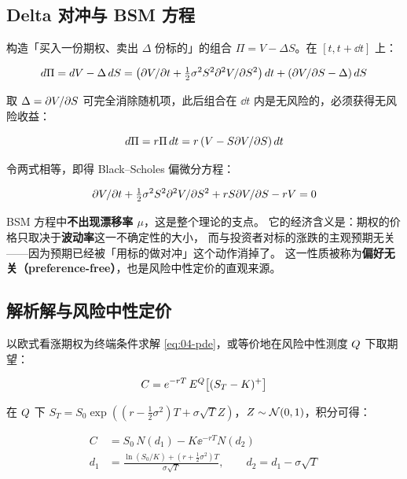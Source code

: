 \subsection{Delta 对冲与 BSM 方程}

构造「买入一份期权、卖出 $\Delta$ 份标的」的组合 $\Pi = V - \Delta S$。在 $[t, t+\dd t]$ 上：

\begin{equation}
  d\Pi = d V - \Delta\,d S
       = \left(\partial V/\partial t + \tfrac12\sigma^2S^2\partial^2 V/\partial S^2\right)d t
         + \left(\partial V/\partial S - \Delta\right)d S
  \label{eq:04-hedge}
\end{equation}

取 $\Delta = \partial V/\partial S$ 可完全消除随机项，此后组合在 $\dd t$ 内是无风险的，必须获得无风险收益：

\begin{equation}
  d\Pi = r\Pi\,d t = r\left(V - S\partial V/\partial S\right)d t
  \label{eq:04-nofree}
\end{equation}

令两式相等，即得 Black--Scholes 偏微分方程：

\begin{equation}
  \partial V/\partial t + \tfrac12\sigma^2S^2\partial^2 V/\partial S^2 + rS\partial V/\partial S - rV = 0
  \label{eq:04-pde}
\end{equation}

\begin{keybox}
BSM 方程中\textbf{不出现漂移率 $\mu$}，这是整个理论的支点。
它的经济含义是：期权的价格只取决于\textbf{波动率}这一不确定性的大小，
而与投资者对标的涨跌的主观预期无关——因为预期已经被「用标的做对冲」这个动作消掉了。
这一性质被称为\textbf{偏好无关（preference-free）}，也是风险中性定价的直观来源。
\end{keybox}

\subsection{解析解与风险中性定价}

以欧式看涨期权为终端条件求解 \cref{eq:04-pde}，或等价地在风险中性测度 $Q$ 下取期望：

\begin{equation}
  C = e^{-rT}\,E^{Q}\!\left[(S_T-K)^+\right]
  \label{eq:04-rnprice}
\end{equation}

在 $Q$ 下 $S_T = S_0\exp\left((r-\tfrac12\sigma^2)T + \sigma\sqrt{T}Z\right)$，$Z\sim\mathcal{N}(0,1)$，积分可得：

\begin{align}
  C &= S_0\,N(d_1) - K\ee^{-rT}N(d_2) \label{eq:04-bsm}\\
  d_1 &= \frac{\ln(S_0/K) + \left(r+\tfrac12\sigma^2\right)T}{\sigma\sqrt{T}},
  \qquad d_2 = d_1 - \sigma\sqrt{T} \label{eq:04-d1d2}
\end{align}

